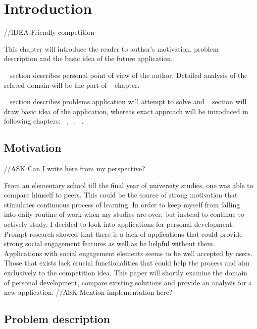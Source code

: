 
\chapter{Introduction}\label{ch:introduction}

{\color{red}//IDEA Friendly competition}

This chapter will introduce the reader to author's motivation, problem description and the basic idea of the future application.

~ section describes personal point of view of the author.
Detailed analysis of the related domain will be the part of ~ chapter.

~ section describes problems application will attempt to solve and
~ section will draw basic idea of the application, whereas exact approach
will be introduced in following chapters: ~, ~, ~.


\section{Motivation}\label{sec:introduction-motivation}

{\color{gray}//ASK Can I write here from my perspective?}

From an elementary school till the final year of university studies, one was able to compare himself to peers.
This could be the source of strong motivation that stimulates continuous process of learning.
In order to keep myself from falling into daily routine of work when my studies are over,
but instead to continue to actively study, I decided to look into applications for personal development.
Prompt research showed that there is a lack of applications that could provide strong social engagement features
as well as be helpful without them.
Applications with social engagement elements seems to be well accepted by users.
Those that exists lack crucial functionalities that could help the process and aim exclusively to the competition idea.
This paper will shortly examine the domain of personal development, compare existing solutions and provide an analysis for a
new application.
{\color{gray}//ASK Mention implementation here?}

\section{Problem description}\label{sec:problem-description}

